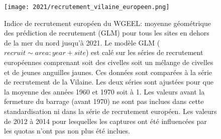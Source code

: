 \documentclass[10pt,twocolumn,titlepage,twoside]{article}\usepackage[]{graphicx}\usepackage[]{color}
\begin{document}
\begin{figure}[htpb]
\centering
\texttt{[image: 2021/recrutement\_vilaine\_europeen.png]}
\caption{Indice de recrutement européen du WGEEL: moyenne géométrique des
prédiction de recrutement (GLM) pour tous les sites en dehors de la mer du nord
jusqu'à 2021. Le modèle GLM ($recruit \sim area:year+site$) est calé sur
les séries de recrutement européennes comprenant soit des civelles soit un
mélange de civelles et de jeunes anguilles jaunes. Ces données sont comparées à la
  série de recrutement de la Vilaine. Les deux séries sont
  ajustées pour que la moyenne des années 1960 et 1970 soit à 1. Les valeurs avant la fermeture du barrage 
  (avant 1970) ne sont pas inclues dans cette standardisation ni dans la série de
  recrutement européen. Les valeurs de 2012 à 2014 pour lesquelles les captures
  ont été influencées par les quotas n'ont pas non plus été inclues.}
\label{figure_recrutement}
\end{figure}
\clearpage

\clearpage
\end{document}
